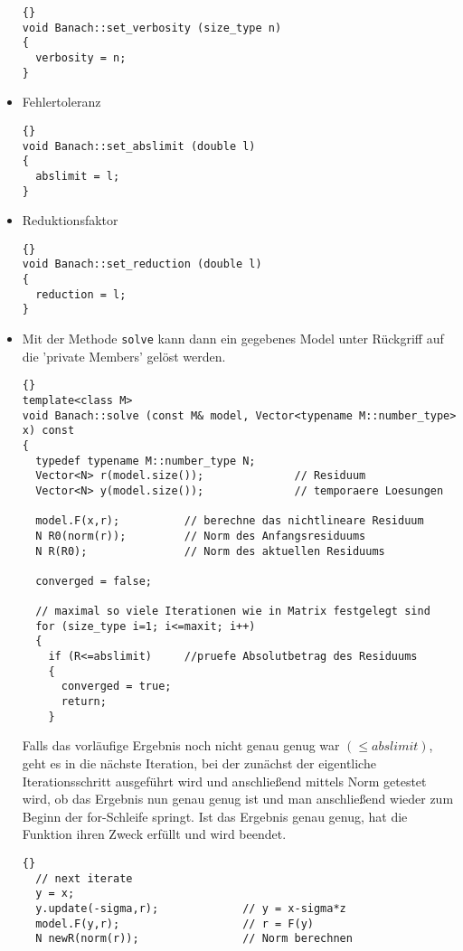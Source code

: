 \documentclass[a4paper,11pt]{article}
\theoremstyle{definition}
\begin{document}
\begin{itemize}
  {\footnotesize{\begin{lstlisting}{}
void Banach::set_verbosity (size_type n)
{
  verbosity = n;
}
\end{lstlisting}}}

\item Fehlertoleranz
  {\footnotesize{\begin{lstlisting}{}
void Banach::set_abslimit (double l)
{
  abslimit = l;
}
\end{lstlisting}}}

\item Reduktionsfaktor
  {\footnotesize{\begin{lstlisting}{}
void Banach::set_reduction (double l)
{
  reduction = l;
}
\end{lstlisting}}}

\item Mit der Methode \lstinline{solve} kann dann ein gegebenes Model
  unter Rückgriff auf die 'private Members' gelöst werden.

  {\footnotesize{\begin{lstlisting}{}
template<class M>
void Banach::solve (const M& model, Vector<typename M::number_type> x) const
{
  typedef typename M::number_type N;
  Vector<N> r(model.size());              // Residuum
  Vector<N> y(model.size());              // temporaere Loesungen

  model.F(x,r);          // berechne das nichtlineare Residuum
  N R0(norm(r));         // Norm des Anfangsresiduums
  N R(R0);               // Norm des aktuellen Residuums

  converged = false;

  // maximal so viele Iterationen wie in Matrix festgelegt sind
  for (size_type i=1; i<=maxit; i++)
  {
    if (R<=abslimit)     //pruefe Absolutbetrag des Residuums
    {
      converged = true;
      return;
    }
  \end{lstlisting}}}

Falls das vorläufige Ergebnis noch nicht genau genug war $(\leqslant
abslimit)$, geht es in die nächste Iteration, bei der zunächst der
eigentliche Iterationsschritt ausgeführt wird und anschließend mittels
Norm getestet wird, ob das Ergebnis nun genau genug ist und man
anschließend wieder zum Beginn der for-Schleife springt. Ist das
Ergebnis genau genug, hat die Funktion ihren Zweck erfüllt und wird
beendet.

{\footnotesize{\begin{lstlisting}{}
  // next iterate
  y = x;
  y.update(-sigma,r);             // y = x-sigma*z
  model.F(y,r);                   // r = F(y)
  N newR(norm(r));                // Norm berechnen


\end{lstlisting}}}
\end{itemize}
\end{document}
